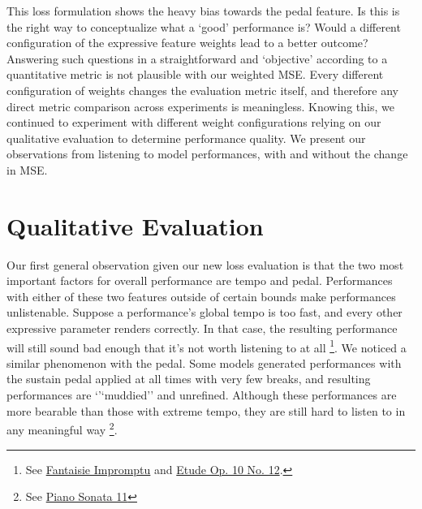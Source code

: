 This loss formulation shows the heavy bias towards the pedal feature. Is this is the right way to conceptualize what a `good' performance is? Would a different configuration of the expressive feature weights lead to a better outcome? Answering such questions in a straightforward and `objective' according to a quantitative metric is not plausible with our weighted MSE. Every different configuration of weights changes the evaluation metric itself, and therefore any direct metric comparison across experiments is meaningless. Knowing this, we continued to experiment with different weight configurations relying on our qualitative evaluation to determine performance quality. We present our observations from listening to model performances, with and without the change in MSE. 



\section{Qualitative Evaluation}\label{sec:qualitative-analysis}
Our first general observation given our new loss evaluation is that the two most important factors for overall performance are tempo and pedal. Performances with either of these two features outside of certain bounds make performances unlistenable. Suppose a performance's global tempo is too fast, and every other expressive parameter renders correctly. In that case, the resulting performance will still sound bad enough that it's not worth listening to at all \footnote%
{See \href{https://ui.neptune.ai/richt3211/thesis/e/THESIS-86/artifacts}{ Fantaisie Impromptu} and \href{https://ui.neptune.ai/richt3211/thesis/e/THESIS-126/artifacts}{ Etude Op. 10 No. 12}.}. We noticed a similar phenomenon with the pedal. Some models generated performances with the sustain pedal applied at all times with very few breaks, and resulting performances are `'`muddied'' and unrefined. Although these performances are more bearable than those with extreme tempo, they are still hard to listen to in any meaningful way \footnote{See \href{https://ui.neptune.ai/richt3211/thesis/e/THESIS-125/artifacts}{ Piano Sonata 11} }. 

